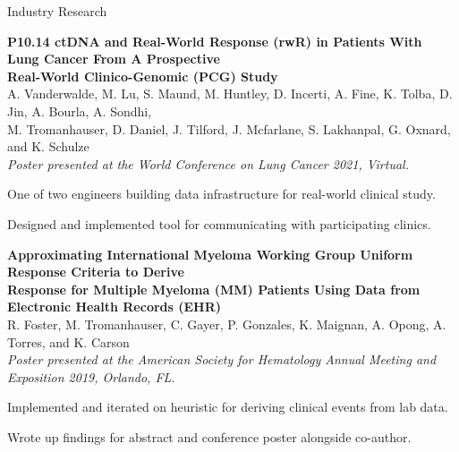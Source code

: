 \documentclass{resume} %
\begin{document}
\begin{grouping}{Industry Research}

\item {\bf P10.14 ctDNA and Real-World Response (rwR) in Patients With Lung Cancer From A Prospective} \\
    {\bf Real-World Clinico-Genomic (PCG) Study} \\
    A. Vanderwalde, M. Lu, S. Maund, M. Huntley, D. Incerti, A. Fine, K. Tolba, D. Jin, A.
    Bourla, A. Sondhi, \\
    M. Tromanhauser, D. Daniel, J. Tilford, J. Mcfarlane, S. Lakhanpal, G. Oxnard,
    and K. Schulze \\
    {\em Poster presented at the World Conference on Lung Cancer 2021, Virtual.}
    \begin{items}
        \item One of two engineers building data infrastructure for real-world clinical study.
        \item Designed and implemented tool for communicating with participating clinics.
    \end{items}
\hspace{5mm}

\item {\bf Approximating International Myeloma Working Group Uniform Response Criteria to Derive} \\
    {\bf Response for Multiple Myeloma (MM) Patients Using Data from Electronic Health
    Records (EHR)} \\
    R. Foster, M. Tromanhauser, C. Gayer, P. Gonzales, K. Maignan, A. Opong, A. Torres, and K. Carson \\
    {\em Poster presented at the American Society for Hematology Annual Meeting and Exposition
    2019, Orlando, FL.}
    \begin{items}
        \item Implemented and iterated on heuristic for deriving clinical events from lab data.
        \item Wrote up findings for abstract and conference poster alongside co-author.
    \end{items}
\hspace{5mm}


\end{grouping}
\end{document}
